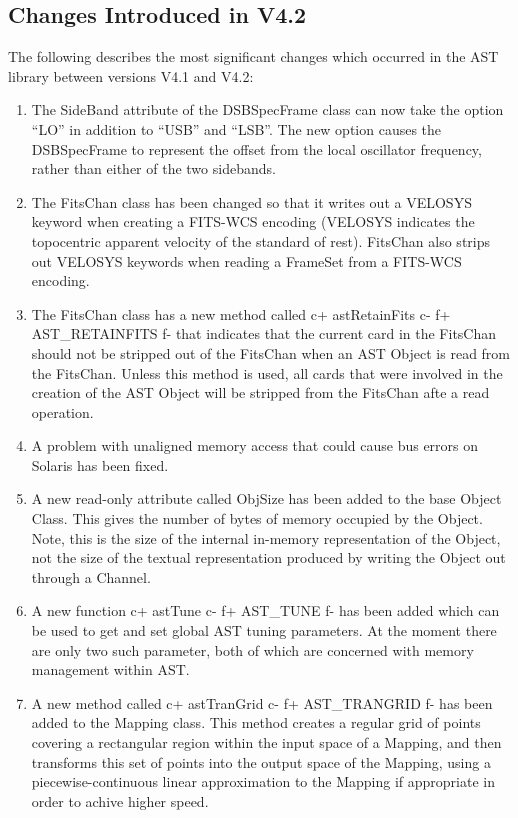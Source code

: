 \documentclass[twoside,11pt]{article}
\begin{document}
\subsection{Changes Introduced in V4.2}

The following describes the most significant changes which 
occurred in the AST library between versions V4.1 and V4.2:

\begin{enumerate}

\item The SideBand attribute of the DSBSpecFrame class can now take the
option ``LO'' in addition to ``USB'' and ``LSB''. The new option causes the
DSBSpecFrame to represent the offset from the local oscillator frequency, 
rather than either of the two sidebands.

\item The FitsChan class has been changed so that it writes out a VELOSYS
keyword when creating a FITS-WCS encoding (VELOSYS indicates the topocentric 
apparent velocity of the standard of rest). FitsChan also strips out VELOSYS 
keywords when reading a FrameSet from a FITS-WCS encoding.

\item The FitsChan class has a new method called 
c+
astRetainFits
c-
f+
AST\_RETAINFITS
f-
that indicates that the current card in the FitsChan should not be
stripped out of the FitsChan when an AST Object is read from the FitsChan.
Unless this method is used, all cards that were involved in the creation
of the AST Object will be stripped from the FitsChan afte a read operation.

\item A problem with unaligned memory access that could cause bus errors on 
Solaris has been fixed.

\item A new read-only attribute called ObjSize has been added to the base
Object Class. This gives the number of bytes of memory occupied by the
Object. Note, this is the size of the internal in-memory representation of 
the Object, not the size of the textual representation produced by
writing the Object out through a Channel.

\item A new function 
c+
astTune 
c-
f+
AST\_TUNE
f-
has been added which can be used to get and set global AST tuning
parameters. At the moment there are only two such parameter, both of
which are concerned with memory management within AST.

\item A new method called 
c+
astTranGrid
c-
f+
AST\_TRANGRID
f-
has been added to the Mapping class. This method creates a regular 
grid of points covering a rectangular region within the input space of a
Mapping, and then transforms this set of points into the output space of the
Mapping, using a piecewise-continuous linear approximation to the Mapping
if appropriate in order to achive higher speed.


\end{enumerate}
\end{document}
